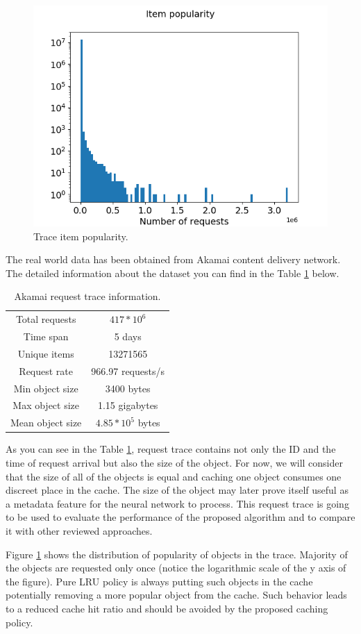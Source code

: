 \begin{figure}[b!]
	\centering
	\includegraphics[totalheight=6cm]{pics/real_item_pop.png}
	\caption{Trace item popularity.}
	\label{fig:pop_1}
\end{figure}

The real world data has been obtained from Akamai content delivery network\cite{12}. The detailed information about the dataset you can find in the Table \ref{table:1} below.

\begin{table}[h!]
	\centering
	\begin{tabular}{| c | c |}
		\hline 
		Total requests & $ 417 * 10^6 $ \\ 
		Time span & 5 days \\
		Unique items & 13271565 \\
		Request rate & 966.97 requests/s \\
		Min object size & 3400 bytes \\
		Max object size & 1.15 gigabytes \\ 
		Mean object size & $ 4.85 * 10^5 $ bytes \\
		\hline
	\end{tabular}
	\caption{Akamai request trace information.}
	\label{table:1}
\end{table}

As you can see in the Table \ref{table:1}, request trace contains not only the ID and the time of request arrival but also the size of the object. For now, we will consider that the size of all of the objects is equal and caching one object consumes one discreet place in the cache. The size of the object may later prove itself useful as a metadata feature for the neural network to process. This request trace is going to be used to evaluate the performance of the proposed algorithm and to compare it with other reviewed approaches.

Figure \ref{fig:pop_1} shows the distribution of popularity of objects in the trace. Majority of the objects are requested only once (notice the logarithmic scale of the y axis of the figure). Pure LRU policy is always putting such objects in the cache potentially removing a more popular object from the cache. Such behavior leads to a reduced cache hit ratio and should be avoided by the proposed caching policy.